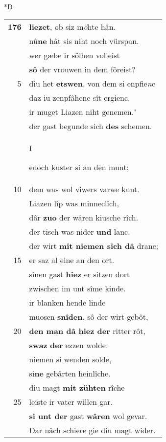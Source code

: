 \documentclass[8pt,a4paper,notitlepage]{article}
\begin{document}
\begin{table}[ht]
\begin{minipage}[t]{0.5\linewidth}
\small
\begin{center}*D
\end{center}
\begin{tabular}{rl}
\textbf{176} & \textbf{liezet}, ob siz m\textit{ö}hte hân.\\ 
 & nû\textbf{ne} hât sis niht noch vürspan.\\ 
 & wer gæbe ir sölhen volleist\\ 
 & \textbf{sô} der vrouwen in dem fôreist?\\ 
5 & diu het \textbf{etswen}, von dem si enpfie\textit{n}c\\ 
 & daz iu zenpfâhene sît ergienc.\\ 
 & ir muget Liazen niht genemen."\\ 
 & der gast begunde sich \textbf{des} schemen.\\ 
 & \begin{large}I\end{large}edoch kuster si an den munt;\\ 
10 & dem was wol viwers varwe kunt.\\ 
 & Liazen lîp was minneclîch,\\ 
 & dâr \textbf{zuo} der wâren kiusche rîch.\\ 
 & der tisch was nider \textbf{und} lanc.\\ 
 & der wirt \textbf{mit niemen sich dâ} dranc;\\ 
15 & er saz al eine an den ort.\\ 
 & sînen gast \textbf{hiez} er sitzen dort\\ 
 & zwischen im unt sîme kinde.\\ 
 & ir blanken hende linde\\ 
 & muosen \textbf{snîden}, sô der wirt gebôt,\\ 
20 & \textbf{den man dâ hiez der} ritter rôt,\\ 
 & \textbf{swaz} \textbf{der} ezzen wolde.\\ 
 & niemen si wenden solde,\\ 
 & si\textbf{ne} gebârten heinlîche.\\ 
 & diu magt \textbf{mit zühten} rîche\\ 
25 & leiste ir vater willen gar.\\ 
 & \textbf{si unt der} gast \textbf{wâren} wol gevar.\\ 
 & Dar nâch schiere gie diu magt wider.\\ 

\end{tabular}
\end{minipage}
\end{table}
\end{document}
